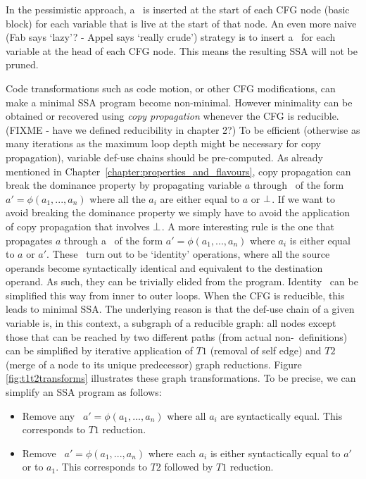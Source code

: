 In the pessimistic approach, a \phiop\ is inserted at the start of each CFG node
(basic block) for each variable that is live at the start of that
node.
An even more naive (Fab says `lazy'? - Appel says `really crude') 
strategy is to insert a \phiop\ for
each variable at the head of each CFG node.
This means the resulting SSA will not be pruned.

Code transformations such as code motion, or other CFG modifications, 
can make a minimal SSA program become non-minimal.
However minimality can be obtained or recovered using 
\textit{copy propagation} whenever the CFG is reducible. 
(FIXME - have we defined reducibility in chapter 2?)
To be efficient (otherwise as many iterations as the maximum loop
depth might be necessary for copy propagation), 
variable def-use chains should be pre-computed. 
As already mentioned in Chapter~\ref{chapter:properties_and_flavours}, 
copy propagation can break the dominance property by propagating
variable $a$ through \phiops\ of the form $a'=\phi(a_1,...,a_n)$ where
all the $a_i$ are either equal to $a$ or $\perp$. 
If we want to avoid breaking the dominance property we simply have to
avoid the application of copy propagation that involves $\perp$. 
A more interesting rule is the one that propagates $a$ through a \phiop\ of the form $a'=\phi(a_1,...,a_n)$ where $a_i$ is either equal to $a$ or $a'$. 
These \phiops\ turn out to be `identity' operations, where all the
source operands become syntactically identical and equivalent to the 
destination operand. As such, they can be trivially elided from the program.
Identity \phiops\ can be simplified this way from inner to outer loops. 
When the CFG is reducible, this leads to minimal SSA. 
The underlying reason is that the def-use chain of a given variable is,
in this context, a subgraph of a reducible graph: 
all nodes except those that can be reached by two different paths (from
actual non-\phiop\ definitions) can be simplified by iterative 
application of 
$T1$ (removal of self edge) and 
$T2$ (merge of a node to its unique predecessor) graph reductions.
Figure \ref{fig:t1t2transforms} illustrates these graph transformations.
To be precise, we can simplify an SSA program as follows:
\begin{itemize}
\item Remove any \phiop\ $a'=\phi(a_1,...,a_n)$ where all $a_i$
  are syntactically equal. This corresponds to $T1$ reduction.
\item Remove \phiop\ $a'=\phi(a_1,...,a_n)$ where each $a_i$
  is either syntactically equal to $a'$ or to $a_1$. This corresponds to $T2$ followed by $T1$ reduction.
\end{itemize}

